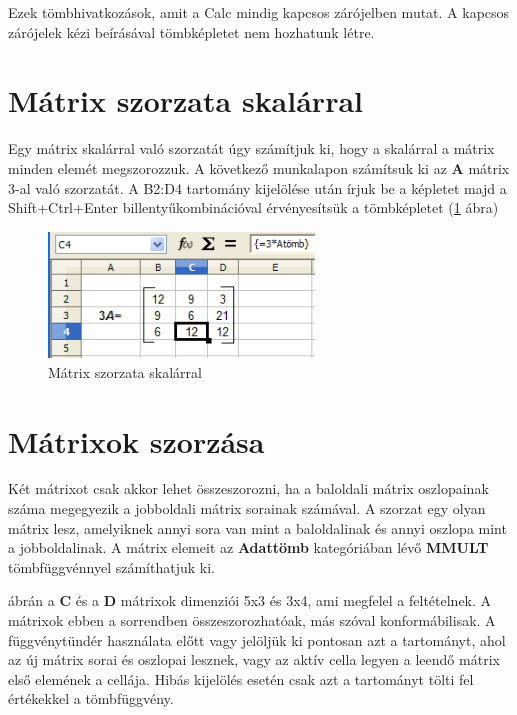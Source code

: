 Ezek tömbhivatkozások, amit a Calc mindig kapcsos zárójelben
mutat. A kapcsos zárójelek kézi beírásával tömbképletet
nem hozhatunk létre.


\section{Mátrix szorzata skalárral}

Egy mátrix skalárral való szorzatát úgy számítjuk ki, hogy
a skalárral a mátrix minden elemét megszorozzuk. A
következő munkalapon számítsuk ki az \textbf{A} mátrix 3-al
való szorzatát. A B2:D4 tartomány kijelölése után írjuk
be a képletet majd a Shift+Ctrl+Enter billentyűkombinációval
érvényesítsük a tömbképletet (\ref{MátrixSzorzataSkalárral} ábra)

\begin{figure}[!h]
\begin{center}
\includegraphics[width=7.077cm]{oocalcv1-img132.png}
\caption{Mátrix szorzata skalárral}\label{MátrixSzorzataSkalárral}
\end{center}
\end{figure}


\section{Mátrixok szorzása}

Két mátrixot csak akkor lehet összeszorozni, ha a baloldali
mátrix oszlopainak száma megegyezik a jobboldali mátrix sorainak
számával. A szorzat egy olyan mátrix lesz, amelyiknek annyi sora
van mint a baloldalinak és annyi oszlopa mint a jobboldalinak. A
mátrix elemeit az \textbf{Adattömb} kategóriában lévő
\textbf{MMULT} tömbfüggvénnyel számíthatjuk ki.

 ábrán a \textbf{C} és a \textbf{D}
mátrixok dimenziói
5x3 és 3x4, ami megfelel a feltételnek. A mátrixok ebben a
sorrendben összeszorozhatóak, más szóval konformábilisak. A
függvénytündér használata előtt vagy jelöljük ki
pontosan azt a tartományt, ahol az új mátrix sorai és oszlopai
lesznek, vagy az aktív cella legyen a leendő mátrix első
elemének a cellája. Hibás kijelölés esetén csak azt a
tartományt tölti fel értékekkel a tömbfüggvény.

